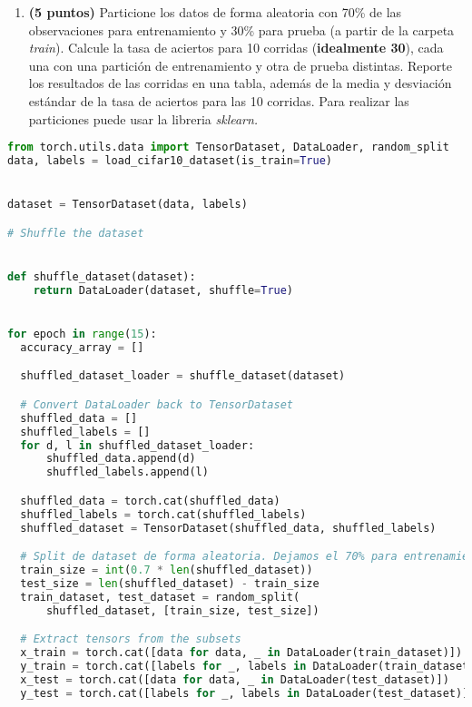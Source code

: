 \documentclass[spanish]{article}
\begin{document}
\begin{enumerate}
\begin{lstlisting}[language=Python, caption=Salida]
\end{lstlisting}

\item \textbf{(5 puntos)} Particione los datos de forma aleatoria con 70\%
de las observaciones para entrenamiento y 30\% para prueba (a partir
de la carpeta \emph{train}). Calcule la tasa de aciertos para 10 corridas
(\textbf{idealmente 30}), cada una con una partición de entrenamiento
y otra de prueba distintas. Reporte los resultados de las corridas
en una tabla, además de la media y desviación estándar de la tasa
de aciertos para las 10 corridas. Para realizar las particiones puede
usar la libreria \emph{sklearn. }
\end{enumerate}


\begin{lstlisting}[language=Python, caption=Entrenamiento con particion de datos]
from torch.utils.data import TensorDataset, DataLoader, random_split
data, labels = load_cifar10_dataset(is_train=True)


dataset = TensorDataset(data, labels)

# Shuffle the dataset


def shuffle_dataset(dataset):
    return DataLoader(dataset, shuffle=True)


for epoch in range(15):
  accuracy_array = []

  shuffled_dataset_loader = shuffle_dataset(dataset)

  # Convert DataLoader back to TensorDataset
  shuffled_data = []
  shuffled_labels = []
  for d, l in shuffled_dataset_loader:
      shuffled_data.append(d)
      shuffled_labels.append(l)

  shuffled_data = torch.cat(shuffled_data)
  shuffled_labels = torch.cat(shuffled_labels)
  shuffled_dataset = TensorDataset(shuffled_data, shuffled_labels)

  # Split de dataset de forma aleatoria. Dejamos el 70% para entrenamiento y el 30% para pruebas
  train_size = int(0.7 * len(shuffled_dataset))
  test_size = len(shuffled_dataset) - train_size
  train_dataset, test_dataset = random_split(
      shuffled_dataset, [train_size, test_size])

  # Extract tensors from the subsets
  x_train = torch.cat([data for data, _ in DataLoader(train_dataset)])
  y_train = torch.cat([labels for _, labels in DataLoader(train_dataset)])
  x_test = torch.cat([data for data, _ in DataLoader(test_dataset)])
  y_test = torch.cat([labels for _, labels in DataLoader(test_dataset)])


\end{lstlisting}
\end{document}
